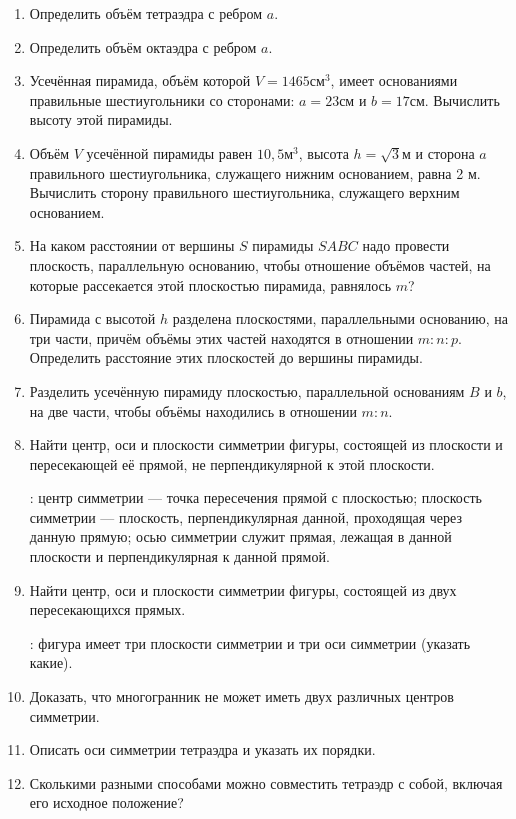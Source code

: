 {\begin{enumerate}[noitemsep]
\item
Определить объём тетраэдра с ребром $a$.

\item
Определить объём октаэдра с ребром $a$.

\item
Усечённая пирамида, объём которой $V = 1465 \text{см}^3$, имеет основаниями правильные шестиугольники со сторонами: $a = 23 \text{см}$ и $b = 17 \text{см}$.
Вычислить высоту этой пирамиды.

\item
Объём $V$ усечённой пирамиды равен $10{,}5\text{м}^3$, высота $h = \sqrt{3}\text{м}$ и сторона $a$ правильного шестиугольника, служащего нижним основанием, равна 2 м.
Вычислить сторону правильного шестиугольника, служащего верхним основанием.

\item
На каком расстоянии от вершины $S$ пирамиды $SABC$ надо провести плоскость, параллельную основанию, чтобы отношение объёмов частей, на которые рассекается этой плоскостью пирамида, равнялось $m$?

\item
Пирамида с высотой $h$ разделена плоскостями, параллельными основанию, на три части, причём объёмы этих частей находятся в отношении $m : n : p$.
Определить расстояние этих плоскостей до вершины пирамиды.

\item
Разделить усечённую пирамиду плоскостью, параллельной основаниям $B$ и $b$, на две части, чтобы объёмы находились в отношении $m:n$.

\item
Найти центр, оси и плоскости симметрии фигуры, состоящей из плоскости и пересекающей её прямой, не перпендикулярной к этой плоскости.

: центр симметрии — точка пересечения прямой с плоскостью;
плоскость симметрии — плоскость, перпендикулярная данной, проходящая через данную прямую;
осью симметрии служит прямая, лежащая в данной плоскости и перпендикулярная к данной прямой.

\item
Найти центр, оси и плоскости симметрии фигуры, состоящей из двух пересекающихся прямых.

: фигура имеет три плоскости симметрии и три оси симметрии (указать какие).

\item Доказать, что многогранник не может иметь двух различных центров симметрии.

\item Описать оси симметрии тетраэдра и указать их порядки.

\item Сколькими разными способами можно совместить тетраэдр с собой, включая его исходное положение?
\end{enumerate}

}
